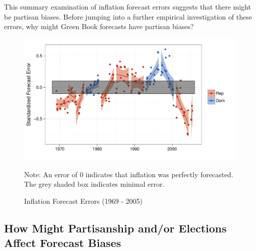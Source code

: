 \documentclass[a4paper]{article}\usepackage{graphicx, color}
\newenvironment{knitrout}{}{} %
\begin{document}
This summary examination of inflation forecast errors suggests that there might be partisan biases. Before jumping into a further empirical investigation of these errors, why might Green Book forecasts have partisan biases?

\begin{figure}[t]
    \caption{Inflation Forecast Errors (1969 - 2005)}
    \label{errors_over_time}
    \begin{center}
    
\begin{knitrout}
\color{fgcolor}\includegraphics[width=0.8\linewidth]{figure/PartisanError} 
\end{knitrout}

    
    \end{center}
    \begin{singlespace}
        {\scriptsize{Note: An error of 0 indicates that inflation was perfectly forecasted. \\
            The grey shaded box indicates minimal error.
        }}
    \end{singlespace}
\end{figure}


\subsection{How Might Partisanship and/or Elections Affect Forecast Biases}




\end{document}
